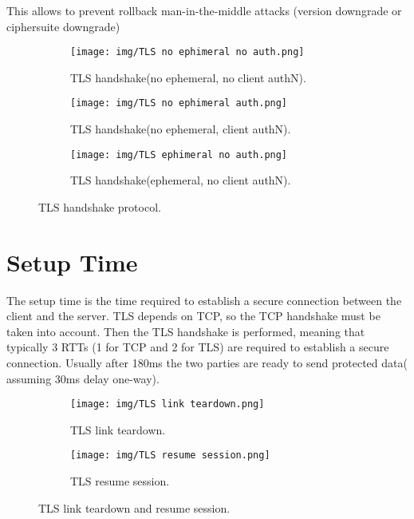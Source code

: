 This allows to prevent rollback man-in-the-middle attacks (version
downgrade or ciphersuite downgrade)

\begin{figure}[h]
  \centering
  \begin{subfigure}{.5\textwidth}
    \centering
    \texttt{[image: img/TLS no ephimeral no
    auth.png]}
    \caption{TLS handshake(no ephemeral, no client authN).}
    \label{fig:tls-handshake-protocol}
  \end{subfigure}%
  \begin{subfigure}{.5\textwidth}
    \centering
    \texttt{[image: img/TLS no ephimeral
    auth.png]}
    \caption{TLS handshake(no ephemeral, client authN).}
    \label{fig:tls-handshake-protocol-2}
  \end{subfigure}
  \begin{subfigure}{.5\textwidth}
    \centering
    \texttt{[image: img/TLS ephimeral no
    auth.png]}
    \caption{TLS handshake(ephemeral, no client authN).}
    \label{fig:tls-handshake-protocol-3}
  \end{subfigure}
  \caption{TLS handshake protocol.}
\end{figure}

\section{Setup Time}
The setup time is the time required to establish a secure connection 
between the client and the server. TLS depends on TCP, so the TCP
handshake must be taken into account. Then the TLS handshake is
performed, meaning that typically 3 RTTs (1 for TCP and 2 for TLS) are
required to establish a secure connection. Usually after 180ms the two
parties are ready to send protected data( assuming 30ms delay
one-way).

\begin{figure}[H]
  \centering
  \begin{subfigure}{.5\textwidth}
    \centering
    \texttt{[image: img/TLS link teardown.png]}
    \caption{TLS link teardown.}  
    \label{fig:tls-link-teardown}
  \end{subfigure}%
  \begin{subfigure}{.5\textwidth}
    \centering
    \texttt{[image: img/TLS resume session.png]}
    \caption{TLS resume session.}
    \label{fig:tls-resume-session}
  \end{subfigure}
  \caption{TLS link teardown and resume session.}
\end{figure}

